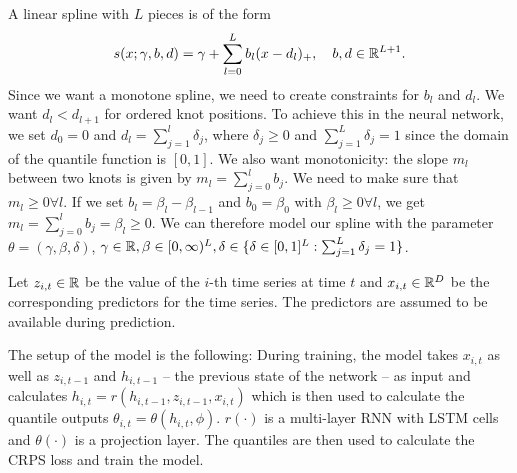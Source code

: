 A linear spline with \(L\) pieces is of the form 
\[ s(x; \gamma, b, d) = \gamma + \sum_{l=0}^L b_l (x - d_l)_+, 
\quad b, d \in \mathbb{R}^{L+1}. \]
Since we want a monotone spline, we need to create constraints for \(b_l\) and \(d_l\).
We want \(d_l < d_{l+1}\) for ordered knot positions. To achieve this 
in the neural network, we set \(d_0 = 0\) and \(d_l = \sum_{j=1}^l \delta_j\), 
where \(\delta_j \geq 0\) and \(\sum_{j=1}^L \delta_j = 1\) since the domain 
of the quantile function is \([0, 1]\). 
We also want monotonicity: the slope \(m_l\) between two knots is given by 
\(m_l = \sum_{j=0}^l b_j\). We need to make sure that \(m_l \geq 0 \forall l\).
If we set \(b_l = \beta_l - \beta_{l-1}\) and \(b_0 = \beta_0\) with \(\beta_l \geq 0 \forall l\), 
we get \(m_l = \sum_{j=0}^l b_j = \beta_l \geq 0\).
We can therefore model our spline with the parameter 
\(\theta = (\gamma, \beta, \delta)\), \(\gamma \in \mathbb{R}, \beta \in [0,\infty)^{L}, 
\delta \in \{ \delta \in [0,1]^L: \sum_{j=1}^L \delta_j = 1 \}\).

Let \(z_{i,t} \in \mathbb{R}\) be the value of the \(i\)-th time series at time \(t\) and 
\(x_{i,t} \in \mathbb{R}^D\) be the corresponding predictors for the time series. 
The predictors are assumed to be available during prediction. 

The setup of the model is the following: 
During training, the model takes \(x_{i,t}\) as well as \(z_{i, t-1}\) 
and \(h_{i, t-1}\) -- the previous state of the network -- 
as input and calculates \(h_{i,t} = r(h_{i, t-1}, z_{i, t-1}, x_{i, t})\)
which is then used to calculate the quantile outputs 
\(\theta_{i,t} = \theta(h_{i,t}, \phi)\).
\(r(\cdot)\) is a multi-layer RNN with LSTM cells and \(\theta(\cdot)\) 
is a projection layer.
The quantiles are then used to calculate the CRPS loss and train the model.